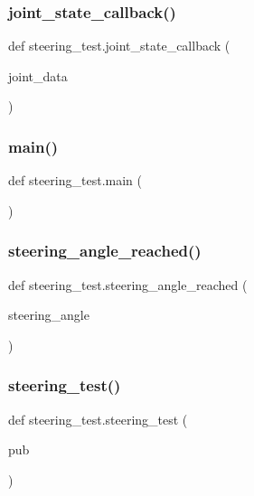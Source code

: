 \subsubsection{\texorpdfstring{joint\_state\_callback()}{joint\_state\_callback()}}
{\footnotesize\ttfamily def steering\+\_\+test.\+joint\+\_\+state\+\_\+callback (\begin{DoxyParamCaption}\item[{}]{joint\+\_\+data }\end{DoxyParamCaption})}

\mbox{\label{namespacesteering__test_a9d5fe21e82ec8c7642ba6b3c9bb8919e}} 
\subsubsection{\texorpdfstring{main()}{main()}}
{\footnotesize\ttfamily def steering\+\_\+test.\+main (\begin{DoxyParamCaption}{ }\end{DoxyParamCaption})}

\mbox{\label{namespacesteering__test_ac7c6bd40ee987a9480e691e05324fee7}} 
\subsubsection{\texorpdfstring{steering\_angle\_reached()}{steering\_angle\_reached()}}
{\footnotesize\ttfamily def steering\+\_\+test.\+steering\+\_\+angle\+\_\+reached (\begin{DoxyParamCaption}\item[{}]{steering\+\_\+angle }\end{DoxyParamCaption})}

\mbox{\label{namespacesteering__test_a3c6b6ed0ed832ad5e4fd2cd28c36e0e5}} 
\subsubsection{\texorpdfstring{steering\_test()}{steering\_test()}}
{\footnotesize\ttfamily def steering\+\_\+test.\+steering\+\_\+test (\begin{DoxyParamCaption}\item[{}]{pub }\end{DoxyParamCaption})}



